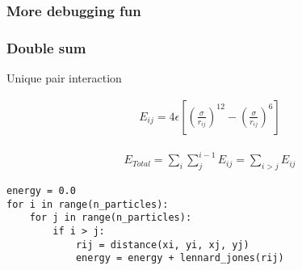\documentclass{beamer}
\begin{document}
\begin{frame}[fragile]

    \frametitle{More debugging fun}


\end{frame}


\begin{frame}[fragile]

    \frametitle{Double sum}

    Unique pair interaction

    \begin{align}
        E_{ij} = 4 \epsilon \left[ \left(\frac{\sigma}{r_{ij}} \right)^{12} - \left(\frac{\sigma}{r_{ij}} \right)^6 \right]
    \end{align}

    \begin{align}
        E_{Total} = \sum_i \sum_{j}^{i-1} E_{ij} = \sum_{i > j} E_{ij}
    \end{align}

\begin{lstlisting}
energy = 0.0
for i in range(n_particles):
    for j in range(n_particles):
        if i > j:
            rij = distance(xi, yi, xj, yj)
            energy = energy + lennard_jones(rij)
\end{lstlisting}

\end{frame}





\end{document}
